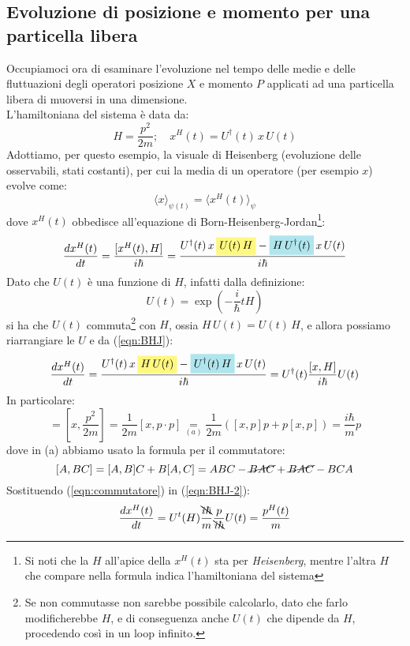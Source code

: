 \documentclass[../../FisicaTeorica.tex]{subfiles}
\begin{document}
\subsection{Evoluzione di posizione e momento per una particella libera}
Occupiamoci ora di esaminare l'evoluzione nel tempo delle medie e delle fluttuazioni degli operatori posizione $X$ e momento $P$ applicati ad una particella libera di muoversi in una dimensione.\\
L'hamiltoniana del sistema è data da:
\[
H=\frac{p^2}{2m};\quad x^H(t)=U^\dag(t)\,x\,U(t)
\]
Adottiamo, per questo esempio, la visuale di Heisenberg (evoluzione delle osservabili, stati costanti), per cui la media di un operatore (per esempio $x$) evolve come:
\[
\langle x \rangle_{\psi(t)}=\langle x^H(t)\rangle_\psi
\]
dove $x^H(t)$ obbedisce all'equazione di Born-Heisenberg-Jordan\footnote{Si noti che la $H$ all'apice della $x^H(t)$ sta per \textit{Heisenberg}, mentre l'altra $H$ che compare nella formula indica l'hamiltoniana del sistema}:
\begin{equation}
\frac{dx^H(t)}{dt}=\frac{[x^H(t),H]}{i\hbar} =
\frac{
U^\dag(t)\,x\,\hlc{Yellow}{U(t)\,H}-\hlc{SkyBlue}{H\,U^\dag(t)}\,x\,U(t)
}{i\hbar}
\label{eqn:BHJ}
\end{equation}
Dato che $U(t)$ è una funzione di $H$, infatti dalla definizione:
\[
U(t)=\exp\left(-\frac{i}{\hbar}tH\right)
\]
si ha che $U(t)$ commuta\footnote{Se non commutasse non sarebbe possibile calcolarlo, dato che farlo modificherebbe $H$, e di conseguenza anche $U(t)$ che dipende da $H$, procedendo così in un loop infinito.} con $H$, ossia $H\,U(t)=U(t)\,H$, e allora possiamo riarrangiare le $U$ e  da (\ref{eqn:BHJ}):
\begin{equation}
\frac{dx^H(t)}{dt}=\frac{U^\dag(t)\,x\,\hlc{Yellow}{H\,U(t)}-\hlc{SkyBlue}{U^\dag(t)\,H}\,x\,U(t)}{i\hbar} 
=U^\dag(t) \frac{[x,H]}{i\hbar}U(t)
\label{eqn:BHJ-2}
\end{equation}
In particolare:
\begin{equation}
[x,H]=\left[x,\frac{p^2}{2m}\right] = \frac{1}{2m}[x,p\cdot p]\underset{(a)}{=}\frac{1}{2m}([x,p]p+p[x,p])=\frac{i\hbar}{m}p
\label{eqn:commutatore}
\end{equation}
dove in (a) abbiamo usato la formula per il commutatore:
\[
[A,BC]=[A,B]C+B[A,C]=ABC-\cancel{BAC}+\cancel{BAC}-BCA
\]
Sostituendo (\ref{eqn:commutatore}) in (\ref{eqn:BHJ-2}):
\begin{equation}
\frac{dx^H(t)}{dt}
=U^t(H)\frac{\bcancel{i\hbar}}{m}\frac{p}{\bcancel{i\hbar}}U(t)=\frac{p^H(t)}{m}
\label{eqn:BHJ-3}
\end{equation}
\end{document}
